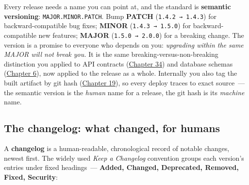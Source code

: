 Every release needs a name you can point at, and the standard is \textbf{semantic versioning}: \texttt{MAJOR.MINOR.PATCH}. Bump \textbf{PATCH} (\texttt{1.4.2\ →\ 1.4.3}) for backward-compatible bug fixes; \textbf{MINOR} (\texttt{1.4.3\ →\ 1.5.0}) for backward-compatible new features; \textbf{MAJOR} (\texttt{1.5.0\ →\ 2.0.0}) for a breaking change. The version is a promise to everyone who depends on you: \emph{upgrading within the same MAJOR will not break you.} It is the same breaking-versus-non-breaking distinction you applied to API contracts (\hyperref[ch:34-response-handling]{Chapter 34}) and database schemas (\hyperref[ch:06-local-dependencies]{Chapter 6}), now applied to the release as a whole. Internally you also tag the built artifact by git hash (\hyperref[ch:19-artifact-storage]{Chapter 19}), so every deploy traces to exact source~--- the semantic version is the \emph{human} name for a release, the git hash is its \emph{machine} name.

\subsection*{The changelog: what changed, for humans}\label{39-local-vs-production:the-changelog-what-changed-for-humans}

A \textbf{changelog} is a human-readable, chronological record of notable changes, newest first. The widely used \emph{Keep a Changelog} convention groups each version's entries under fixed headings~--- \textbf{Added, Changed, Deprecated, Removed, Fixed, Security}:

\begin{codebox}[short]

\begin{Shaded}
\begin{Highlighting}[]


\SpecialStringTok{{-} }\DataTypeTok{\textless{}}\DataTypeTok{\textgreater{}}
\SpecialStringTok{{-} }
\SpecialStringTok{{-} }
\SpecialStringTok{{-} }
\end{Highlighting}
\end{Shaded}

\end{codebox}


